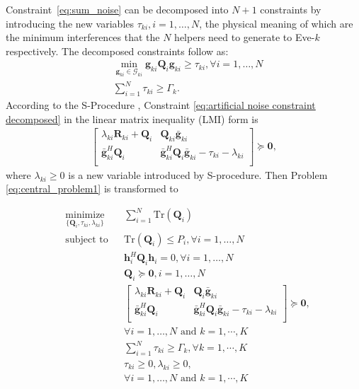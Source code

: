 \documentclass[journal]{IEEEtran}
\begin{document}
Constraint~\eqref{eq:sum_noise} can be decomposed into $N+1$ constraints by introducing the new variables $\tau_{ki}, i =1,\ldots,N$, the physical meaning of which are the minimum interferences that the $N$ helpers need to generate to Eve-$k$ respectively. The decomposed constraints follow as:
\begin{eqnarray}
&\underset{\mathbf{g}_{ki} \in \mathcal{G}_{ki} }\min\mathbf{g}_{ki}\mathbf{Q}_i\mathbf{g}_{ki} \geq  \tau_{ki}, \forall i = 1,\ldots,N\label{eq:artificial noise constraint decomposed} \label{eq:qos_eve_helper}\\
&\sum_{i =1}^{N}\tau_{ki} \geq \Gamma_k \label{eq:sum_noise_constraint}.
\end{eqnarray}
According to the S-Procedure \cite{ConvexOpt_Boyd}, Constraint \eqref{eq:artificial noise constraint decomposed}  in the linear matrix inequality (LMI) form is
\begin{eqnarray}
\left[ {\begin{array}{cc}
	\lambda_{ki}\mathbf{R}_{ki}+\mathbf{Q}_{i}  & \mathbf{Q}_{ki}\bar{\mathbf{g}}_{ki} \\
	\bar{\mathbf{g}}_{ki}^H\mathbf{Q}_{i}& \bar{\mathbf{g}}_{ki}^H\mathbf{Q}_i\bar{\mathbf{g}}_{ki}- \tau_{ki} -\lambda_{ki}\\
	\end{array} } \right] \succeq \mathbf{0},
\end{eqnarray}
where $\lambda_{ki} \geq 0$ is a new variable introduced by S-procedure.
Then Problem \eqref{eq:central_problem1} is transformed to


%
%
%
\begin{equation}
\begin{aligned} \label{eq:problem2}
& \underset{\{\mathbf{Q}_i,\tau_{ki},\lambda_{ki}\}}{\text{minimize}}
& & \sum_{i = 1}^{N}\mathrm{Tr}(\mathbf{Q}_i) \\
& \text{subject to}
& & \mathrm{Tr}(\mathbf{Q}_i) \leq P_i, \forall i = 1, \ldots, N\\
&&& \mathbf{h}_i^H \mathbf{Q}_i \mathbf{h}_i= 0, \forall i = 1,\ldots,N\\
&&&\mathbf{Q}_i \succeq \mathbf{0},i = 1,\ldots,N\\
&&& \left[ {\begin{array}{cc}
	\lambda_{ki}\mathbf{R}_{ki}+\mathbf{Q}_{i}  & \mathbf{Q}_{i}\bar{\mathbf{g}}_{ki} \\
	\bar{\mathbf{g}}_{ki}^H\mathbf{Q}_{i}& \bar{\mathbf{g}}_{ki}^H\mathbf{Q}_i\bar{\mathbf{g}}_{ki}- \tau_{ki} -\lambda_{ki}\\
	\end{array} } \right] \succeq \mathbf{0},\\
&&&\forall i = 1,\ldots,N \text{~and~} k = 1,\cdots,K\\
&&&\sum_{i =1}^{N}\tau_{ki} \geq \Gamma_k, \forall k =1,\cdots,K\\
&&&\tau_{ki} \geq 0, \lambda_{ki} \geq 0,\\
&&&\forall i = 1,\ldots,N \text{~and~} k = 1,\cdots,K\\
\end{aligned}
\end{equation}
\end{document}
